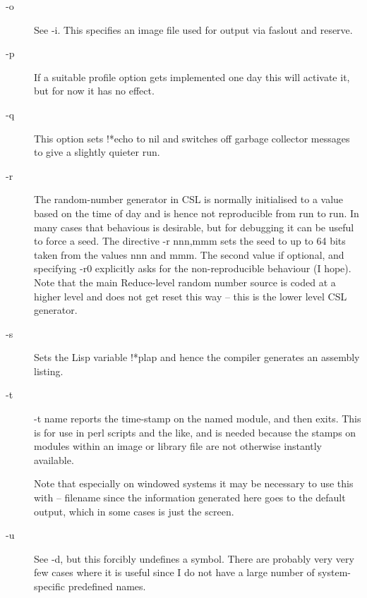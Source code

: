 \documentclass[a4paper,11pt]{article}
\begin{document}
\begin{description}
\item [{\ttfamily -o}] 
See {\ttfamily -i}. This specifies an image file used for output via
{\ttfamily faslout} and {\ttfamily reserve}.

\item [{\ttfamily -p}] 
If a suitable profile option gets implemented one day this will activate it,
but for now it has no effect.

\item [{\ttfamily -q}] 
This option sets {\ttfamily !*echo} to {\ttfamily nil} and switches off
garbage collector messages to give a slightly quieter run.

\item [{\ttfamily -r}] 
The random-number generator in CSL is normally initialised to a value
based on the time of day and is hence not reproducible from run to run.
In many cases that behavious is desirable, but for debugging it can be useful
to force a seed. The directive {\ttfamily -r nnn,mmm} sets the seed to
up to 64 bits taken from the values nnn and mmm. The second value if optional,
and specifying {\ttfamily -r0}  explicitly asks for the non-reproducible
behaviour (I hope). Note that the main Reduce-level random number source is
coded at a higher level and does not get reset this way -- this is the
lower level CSL generator.

\item [{\ttfamily -s}] 
Sets the Lisp variable {\ttfamily !*plap} and hence the compiler generates
an assembly listing.

\item [{\ttfamily -t}] 
{\ttfamily -t name} reports the time-stamp on the named module, and then
exits. This is for use in perl scripts and the like, and is
needed because the stamps on modules within an image or
library file are not otherwise instantly available.
  
Note that especially on windowed systems it may be necessary to use this
with {\ttfamily -- filename} since the information generated here goes to
the default output, which in some cases is just the screen.

\item [{\ttfamily -u}] 
See {\ttfamily -d}, but this forcibly undefines a symbol. There are probably
very very few cases where it is useful since I do not have a large
number of system-specific predefined names.


\end{description}
\end{document}
